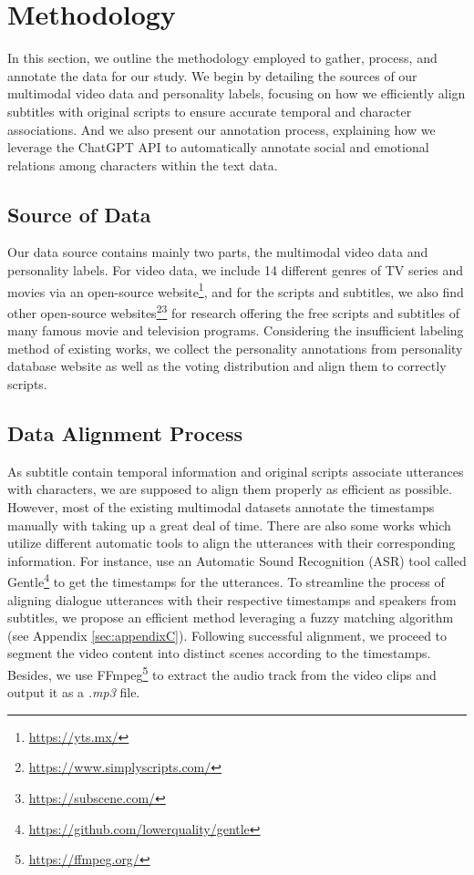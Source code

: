 \section{Methodology}
In this section, we outline the methodology employed to gather, process, and annotate the data for our study. We begin by detailing the sources of our multimodal video data and personality labels, focusing on how we efficiently align subtitles with original scripts to ensure accurate temporal and character associations. And we also present our annotation process, explaining how we leverage the ChatGPT API to automatically annotate social and emotional relations among characters within the text data. 
\subsection{Source of Data}
Our data source contains mainly two parts, the multimodal video data and personality labels. For video data, we include 14 different genres of TV series and movies via an open-source website\footnote[1]{\href{https://yts.mx/}{https://yts.mx/}}, and for the scripts and subtitles, we also find other open-source websites\footnote[2]{\href{https://www.simplyscripts.com/}{https://www.simplyscripts.com/}}\footnote[3]{\href{https://subscene.com/}{https://subscene.com/}} for research offering the free scripts and subtitles of many famous movie and television programs. Considering the insufficient labeling method of existing works, we collect the personality annotations from personality database website as well as the voting distribution and align them to correctly scripts. 
\subsection{Data Alignment Process}
As subtitle contain temporal information and original scripts associate utterances with characters, we are supposed to align them properly as efficient as possible. However, most of the existing multimodal datasets annotate the timestamps manually with taking up a great deal of time. There are also some works which utilize different automatic tools to align the utterances with their corresponding information. For instance, \citet{lian2024merbench} use an Automatic Sound Recognition (ASR) tool called Gentle\footnote[4]{\href{https://github.com/lowerquality/gentle}{https://github.com/lowerquality/gentle}} to get the timestamps for the utterances. To streamline the process of aligning dialogue utterances with their respective timestamps and speakers from subtitles, we propose an efficient method leveraging a fuzzy matching algorithm (see Appendix \ref{sec:appendixC}). 
Following successful alignment, we proceed to segment the video content into distinct scenes according to the timestamps. Besides, we use FFmpeg\footnote[1]{\href{https://ffmpeg.org/}{https://ffmpeg.org/}} to extract the audio track from the video clips and output it as a \textit{.mp3} file.


